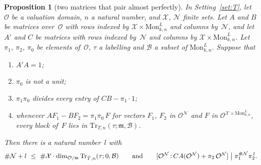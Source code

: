 \documentclass[11pt,a4paper]{article}
\newcommand{\m}[1]{\mbox{$#1$}}        %
\theoremstyle{plainx}
\newtheorem{proposition}[theorem]{Proposition}
\theoremstyle{uprightx}
\newcommand{\cO}{\mathcal{O}}
\newcommand{\cX}{\mathcal{X}}
\newcommand{\cN}{\mathcal{N}}
\newcommand{\fm}{\mathfrak{m}}
\newcommand{\Fam}{\mathrm{Mon}_{k,n}^{L}}
\newcommand{\trl}[5]{\mathrm{Tr}_{#1,#2}(#3;#4,#5)}
\begin{document}
\begin{proposition}[two matrices that pair almost perfectly]\label{p:pairing}
In Setting~\ref{set:T}, let $\cO$ be a valuation domain, $n$ a natural number, and $\cX$, $\cN$ finite sets. Let
$A$ and $B$ be matrices over~$\cO$ with rows indexed by \m{\cX\times\Fam} and columns by~$\cN$, and let $A'$ and
$C$ be matrices with rows indexed by~$\cN$ and columns by \m{\cX\times\Fam}. Let \m{\pi_1}, \m{\pi_2}, \m{\pi_0} be
elements of~$\cO$, $\tau$ a labelling and $\mathcal{B}$ a subset of \m{\Fam}. Suppose that
\begin{enumerate}[label=\textup{(\roman*)},leftmargin=2.3em,itemsep=1pt,topsep=2pt]
\item \m{A'A=1};
\item \m{\pi_0} is not a unit;
\item \m{\pi_1\pi_0} divides every entry of \m{CB-\pi_1\cdot1};
\item whenever \m{AF_1-BF_2=\pi_1\pi_0\,F} for vectors \m{F_1}, \m{F_2} in \m{\cO^{\cN}} and $F$ in
\m{\cO^{\cX\times\Fam}}, every block of~$F$ lies in \m{\trl{T}{n}{\tau}{\fm}{\mathcal{B}}}.
\end{enumerate}
Then there is a natural number~$l$ with
\[\#\cN+l\ \le\ \#\cX\cdot\dim_{\cO/\fm}\trl{\bar T}{n}{\tau}{0}{\mathcal{B}}\qquad\text{and}\qquad
\IndexDvd{\cO^{\cN}}{CA(\cO^{\cN})+\pi_2\,\cO^{\cN}}{\pi_1^{\#\cN}\pi_2^{\,l}} .\]
\end{proposition}
\end{document}
